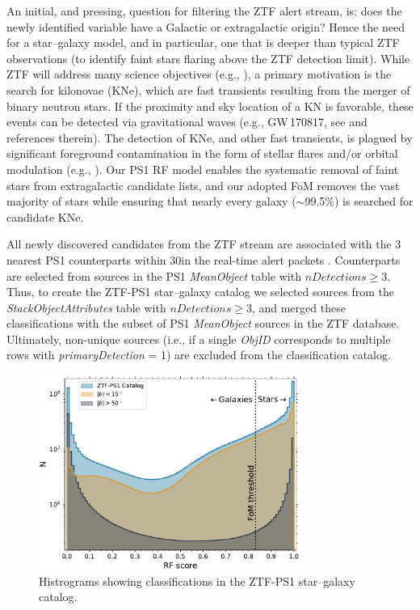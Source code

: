 \documentclass[twocolumn, dvipdfmx]{aastex62}
\begin{document}
An initial, and pressing, question for filtering the ZTF alert stream, is:
does the newly identified variable have a Galactic or extragalactic origin?
Hence the need for a star--galaxy model, and in particular, one that is
deeper than typical ZTF observations (to identify faint stars flaring above
the ZTF detection limit). While ZTF will address many science objectives
(e.g., \citealt{Graham:18:ZTF}), a primary motivation is the search for
kilonovae (KNe), which are fast transients resulting from the merger of
binary neutron stars. If the proximity and sky location of a KN is
favorable, these events can be detected via gravitational waves (e.g.,
GW\,170817, see \citealt{Abbott17} and references therein). The detection of
KNe, and other fast transients, is plagued by significant foreground
contamination in the form of stellar flares and/or orbital modulation (e.g.,
\citealt{Kulkarni06, Berger12, Kasliwal16}). Our PS1 RF model enables the
systematic removal of faint stars from extragalactic candidate lists, and
our adopted FoM removes the vast majority of stars while ensuring that
nearly every galaxy ($\sim$99.5\%) is searched for candidate KNe.

All newly discovered candidates from the ZTF stream are associated with the
3 nearest PS1 counterparts within 30\arcsec in the real-time alert packets
\citep{Masci:18:ZTF}. Counterparts are selected from sources in the PS1
\textit{MeanObject} table with $\mathit{nDetections} \ge 3$. Thus, to create
the ZTF-PS1 star--galaxy catalog we selected sources from the
\textit{StackObjectAttributes} table with $\mathit{nDetections} \ge 3$, and
merged these classifications with the subset of PS1 \textit{MeanObject}
sources in the ZTF database. Ultimately, non-unique sources (i.e., if a
single \textit{ObjID} corresponds to multiple rows with
\textit{primaryDetection} = 1) are excluded from the classification catalog.

\begin{figure}[htb]
 \centering
  \includegraphics[width=3.35in]{./Figures/ZTF_PS1_cat_hist.pdf}
  \caption{ Histrograms showing classifications in the ZTF-PS1 star--galaxy
  catalog. }
  \label{fig:ztf_hist}
\end{figure}
\end{document}

